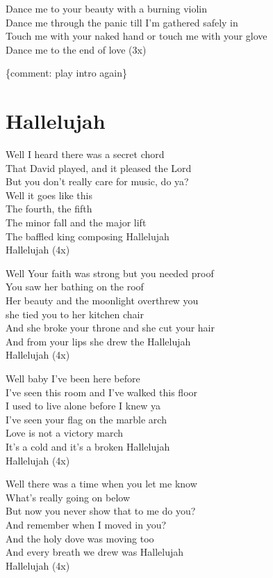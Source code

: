 \documentclass[
  letterpaper,
  DIV=11,
  numbers=noendperiod]{scrreprt}
\begin{document}
Dance me to your beauty with a burning violin\\
Dance me through the panic till I'm gathered safely in\\
Touch me with your naked hand or touch me with your glove\\
Dance me to the end of love (3x)

\{comment: play intro again\}

\hypertarget{hallelujah}{%
\chapter{Hallelujah}\label{hallelujah}}

Well I heard there was a secret chord\\
That David played, and it pleased the Lord\\
But you don't really care for music, do ya?\\
Well it goes like this\\
The fourth, the fifth\\
The minor fall and the major lift\\
The baffled king composing Hallelujah\\
Hallelujah (4x)

Well Your faith was strong but you needed proof\\
You saw her bathing on the roof\\
Her beauty and the moonlight overthrew you\\
she tied you to her kitchen chair\\
And she broke your throne and she cut your hair\\
And from your lips she drew the Hallelujah\\
Hallelujah (4x)

Well baby I've been here before\\
I've seen this room and I've walked this floor\\
I used to live alone before I knew ya\\
I've seen your flag on the marble arch\\
Love is not a victory march\\
It's a cold and it's a broken Hallelujah\\
Hallelujah (4x)

Well there was a time when you let me know\\
What's really going on below\\
But now you never show that to me do you?\\
And remember when I moved in you?\\
And the holy dove was moving too\\
And every breath we drew was Hallelujah\\
Hallelujah (4x)
\end{document}
